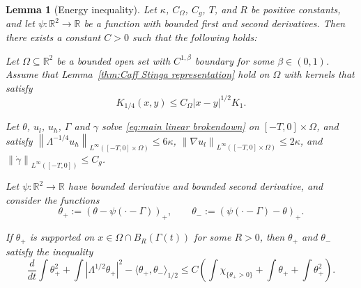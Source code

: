 \documentclass[11pt]{amsart}
\newtheorem{lemma}[theorem]{Lemma}
\theoremstyle{remark}
\theoremstyle{definition}
\newcommand{\R}{\mathbb{R}}
\newcommand{\chevron}[1]{\langle #1 \rangle}
\newcommand{\norm}[1]{\left\lVert#1\right\rVert}
\newcommand{\paren}[1]{\left( #1 \right)}
\newcommand{\bracket}[1]{\left[ #1 \right]}
\newcommand{\abs}[1]{\left\lvert #1 \right\rvert}
\newcommand{\grad}{\nabla}
\newcommand{\ddt}{\frac{d}{dt}}
\newcommand{\Lip}{\text{Lip}}
\newcommand{\indic}[1]{\chi_{\{#1\}}}
\newcommand{\ulow}{u_l}
\newcommand{\uhigh}{u_h}
\newcommand{\Cgamma}{C_g}
\newcommand{\Comega}{C_\Omega}
\begin{document}
\begin{lemma}[Energy inequality] \label{thm:energy inequality}
Let $\kappa$, $\Comega$, $\Cgamma$, $T$, and $R$ be positive constants, and let $\psi:\R^2 \to \R$ be a function with bounded first and second derivatives. Then there exists a constant $C>0$ such that the following holds:

Let $\Omega \subseteq \R^2$ be a bounded open set with $C^{1,\beta}$ boundary for some $\beta \in (0,1)$.  Assume that Lemma~\ref{thm:Caff Stinga representation} hold on $\Omega$ with kernels that satisfy
\[ K_{1/4}(x,y) \leq \Comega |x-y|^{1/2} K_{1}. \]

Let $\theta$, $\ulow$, $\uhigh$, $\Gamma$ and $\gamma$ solve \eqref{eq:main linear brokendown} on $[-T,0]\times\Omega$, and satisfy $\norm{\Lambda^{-1/4} \uhigh}_{L^\infty([-T,0]\times\Omega)} \leq 6 \kappa$, $\norm{\grad \ulow}_{L^\infty([-T,0]\times\Omega)} \leq 2\kappa$, and $\norm{\dot{\gamma}}_{L^\infty([-T,0])} \leq \Cgamma$.  

Let $\psi:\R^2 \to \R$ have bounded derivative and bounded second derivative, and consider the functions
\[ \theta_+ := \paren{\theta - \psi(\cdot-\Gamma)}_+, \qquad \theta_- := \paren{\psi(\cdot-\Gamma) - \theta}_+. \]

If $\theta_+$ is supported on $x \in \Omega \cap B_R(\Gamma(t))$ for some $R>0$, then $\theta_+$ and $\theta_-$ satisfy the inequality
\[ \ddt \int \theta_+^2 + \int \abs{\Lambda^{1/2} \theta_+}^2 - \chevron{\theta_+,\theta_-}_{1/2} \leq C \paren{ \int \indic{\theta_+ > 0} + \int \theta_+ + \int \theta_+^2 }. \]
\end{lemma}
\end{document}
